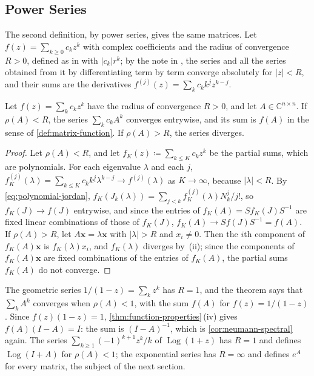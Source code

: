 \subsection{Power Series}

The second definition, by power series, gives the same matrices. Let $f(z)=\sum_{k\ge0}c_kz^k$ with complex coefficients and the radius of convergence $R>0$, defined as in  with $|c_k|r^k$; by the note in , the series and all the series obtained from it by differentiating term by term converge absolutely for $|z|<R$, and their sums are the derivatives $f^{(j)}(z)=\sum_kc_kk^{\underline j}z^{k-j}$.

\begin{theorem}
\label{thm:power-series-matrix}
Let $f(z)=\sum_kc_kz^k$ have the radius of convergence $R>0$, and let $A\in\mathbb C^{n\times n}$. If $\rho(A)<R$, the series $\sum_kc_kA^k$ converges entrywise, and its sum is $f(A)$ in the sense of \cref{def:matrix-function}. If $\rho(A)>R$, the series diverges.
\end{theorem}

\begin{proof}
Let $\rho(A)<R$, and let $f_K(z)\coloneqq\sum_{k\le K}c_kz^k$ be the partial sums, which are polynomials. For each eigenvalue $\lambda$ and each $j$, $f_K^{(j)}(\lambda)=\sum_{k\le K}c_kk^{\underline j}\lambda^{k-j}\to f^{(j)}(\lambda)$ as $K\to\infty$, because $|\lambda|<R$. By \eqref{eq:polynomial-jordan}, $f_K(J_k(\lambda))=\sum_{j<k}f_K^{(j)}(\lambda)N_k^j/j!$, so $f_K(J)\to f(J)$ entrywise, and since the entries of $f_K(A)=Sf_K(J)S^{-1}$ are fixed linear combinations of those of $f_K(J)$, $f_K(A)\to Sf(J)S^{-1}=f(A)$. If $\rho(A)>R$, let $A\mathbf x=\lambda\mathbf x$ with $|\lambda|>R$ and $x_i\ne0$. Then the $i$th component of $f_K(A)\mathbf x$ is $f_K(\lambda)x_i$, and $f_K(\lambda)$ diverges by \,(ii); since the components of $f_K(A)\mathbf x$ are fixed combinations of the entries of $f_K(A)$, the partial sums $f_K(A)$ do not converge.
\end{proof}

The geometric series $1/(1-z)=\sum_kz^k$ has $R=1$, and the theorem says that $\sum_kA^k$ converges when $\rho(A)<1$, with the sum $f(A)$ for $f(z)=1/(1-z)$. Since $f(z)(1-z)=1$, \cref{thm:function-properties}\,(iv) gives $f(A)(I-A)=I$: the sum is $(I-A)^{-1}$, which is \cref{cor:neumann-spectral} again. The series $\sum_{k\ge1}(-1)^{k+1}z^k/k$ of $\operatorname{Log}(1+z)$ has $R=1$ and defines $\operatorname{Log}(I+A)$ for $\rho(A)<1$; the exponential series has $R=\infty$ and defines $e^A$ for every matrix, the subject of the next section.

